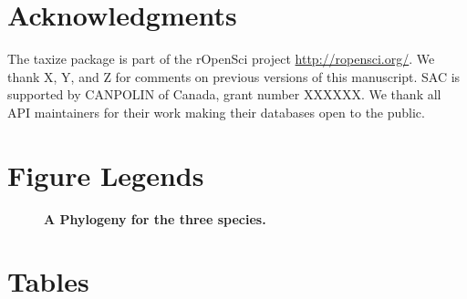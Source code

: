\documentclass[10pt]{article}\usepackage{graphicx, color}
\begin{document}
\section*{Acknowledgments}
The taxize package is part of the rOpenSci project \url{http://ropensci.org/}. We thank X, Y, and Z for comments on previous versions of this manuscript. SAC is supported by CANPOLIN of Canada, grant number XXXXXX. We thank all API maintainers for their work making their databases open to the public.



\section*{Figure Legends}
\begin{figure}[!ht]
\begin{center}
\end{center}
\caption{
{\bf A Phylogeny for the three species.}
}
\label{fig:phylomatic}
\end{figure}


\section*{Tables}
\end{document}
